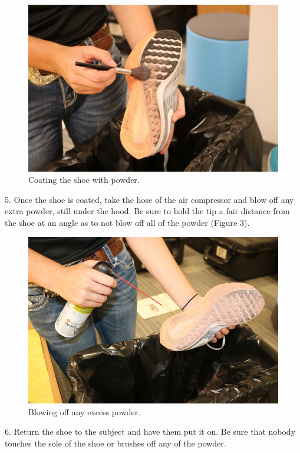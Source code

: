 \begin{figure}[!htp]
\centering
\includegraphics[scale=0.4]{Powder_Brush}
\caption{Coating the shoe with powder.}
\label{Figure 2}
\end{figure}

\newpage

5. Once the shoe is coated, take the hose of the air compressor and blow off any extra powder, still under the hood. Be sure to hold the tip a fair distance from the shoe at an angle as to not blow off all of the powder (Figure 3). 

\begin{figure}[!htp]
\centering
\includegraphics[scale=0.3]{Powder_Air}
\caption{Blowing off any excess powder.}
\label{Figure 3}
\end{figure}

6. Return the shoe to the subject and have them put it on. Be sure that nobody touches the sole of the shoe or brushes off any of the powder. 

